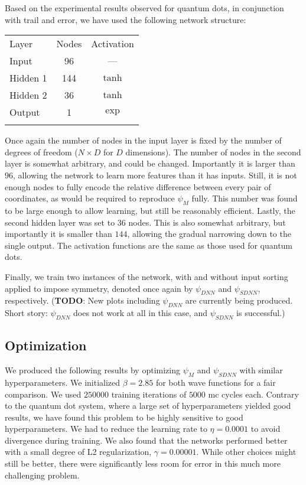 \documentclass[Thesis.tex]{subfiles}
\begin{document}
Based on the experimental results observed for quantum dots, in conjunction with
trail and error, we have used the following network structure:

\begin{center}
  \begin{tabular}{lcc}
    \toprule
    \addlinespace
    Layer & Nodes & Activation\\
    \addlinespace
    \midrule
    \addlinespace
    \addlinespace
    Input & 96 & ---\\
    Hidden 1& 144 & $\tanh$\\
    Hidden 2& 36 & $\tanh$\\
    Output & 1 & $\exp$\\
    \addlinespace
    \addlinespace
    \bottomrule
  \end{tabular}
\end{center}
Once again the number of nodes in the input layer is fixed by the
number of degrees of freedom ($N\times D$ for $D$ dimensions). The number of
nodes in the second layer is somewhat arbitrary, and could be changed.
Importantly it is larger than $96$, allowing the network to learn more features
than it has inputs. Still, it is not enough nodes to fully encode the relative
difference between every pair of coordinates, as would be required to reproduce
$\psi_M$ fully. This number was found to be large enough to allow learning, but
still be reasonably efficient. Lastly, the second hidden layer was set to $36$
nodes. This is also somewhat arbitrary, but importantly it is smaller than
$144$, allowing the gradual narrowing down to the single output. The activation
functions are the same as those used for quantum dots.

Finally, we train two instances of the network, with and without input sorting
applied to impose symmetry, denoted once again by $\psi_{DNN}$ and
$\psi_{SDNN}$, respectively. (\textbf{TODO}: New plots including $\psi_{DNN}$
are currently being produced. Short story: $\psi_{DNN}$ does not work at all in this
case, and $\psi_{SDNN}$ is successful.)

\subsection{Optimization}

We produced the following results by optimizing $\psi_M$ and $\psi_{SDNN}$ with
similar hyperparameters. We initialized $\beta=\num{2.85}$ for both wave functions
for a fair comparison. We used $\num{250000}$ training iterations of
$\num{5000}$ \gls{mc} cycles each. Contrary to the quantum dot system, where a large
set of hyperparameters yielded good results, we have found this problem to be
highly sensitive to good hyperparameters. We had to reduce the learning rate to
$\eta=\num{0.0001}$ to avoid divergence during training. We also found that the
networks performed better with a small degree of L2 regularization,
$\gamma=\num{0.00001}$. While other choices might still be better, there were
significantly less room for error in this much more challenging problem.
\end{document}

